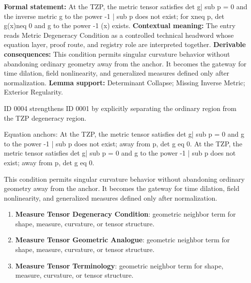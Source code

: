 \begingroup\footnotesize\setlength{\emergencystretch}{3em}\sloppy
\textbf{Formal statement:} At the TZP, the metric tensor satisfies det g| sub p = 0 and the inverse metric g to the power -1 | sub p does not exist; for xneq p, det g(x)neq 0 and g to the power -1 (x) exists. \textbf{Contextual meaning:} The entry reads Metric Degeneracy Condition as a controlled technical headword whose equation layer, proof route, and registry role are interpreted together. \textbf{Derivable consequences:} This condition permits singular curvature behavior without abandoning ordinary geometry away from the anchor. It becomes the gateway for time dilation, field nonlinearity, and generalized measures defined only after normalization. \textbf{Lemma support:} Determinant Collapse; Missing Inverse Metric; Exterior Regularity.\par
\endgroup

ID 0004 strengthens ID 0001 by explicitly separating the ordinary region from the TZP degeneracy region.

Equation anchors: At the TZP, the metric tensor satisfies det g| sub p = 0 and g to the power -1 | sub p does not exist; away from p, det g eq 0. At the TZP, the metric tensor satisfies det g| sub p = 0 and g to the power -1 | sub p does not exist; away from p, det g eq 0.

This condition permits singular curvature behavior without abandoning ordinary geometry away from the anchor. It becomes the gateway for time dilation, field nonlinearity, and generalized measures defined only after normalization.
\endgroup

\begingroup\footnotesize\sloppy
\begin{enumerate}[leftmargin=1.35em,itemsep=1pt,topsep=1pt,parsep=0pt]
\item \textbf{Measure Tensor Degeneracy Condition}: geometric neighbor term for shape, measure, curvature, or tensor structure.
\item \textbf{Measure Tensor Geometric Analogue}: geometric neighbor term for shape, measure, curvature, or tensor structure.
\item \textbf{Measure Tensor Terminology}: geometric neighbor term for shape, measure, curvature, or tensor structure.
\end{enumerate}
\endgroup

